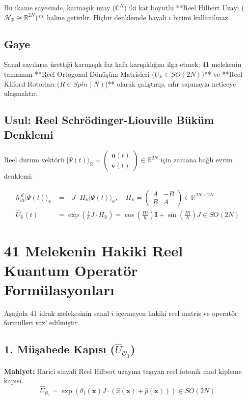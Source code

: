 \documentclass[11pt, a4paper]{article}
\begin{document}
Bu ikame sayesinde, karmaşık uzay ($\mathbb{C}^N$) iki kat boyutlu **Reel Hilbert Uzayı ($\mathcal{H}_{\mathbb{R}} \cong \mathbb{R}^{2N}$)** haline getirilir. Hiçbir denklemde hayali $i$ birimi kullanılmaz.

\subsection{Gaye}
Sanal sayıların ürettiği karmaşık faz kafa karışıklığını ilga etmek; 41 melekenin tamamını **Reel Ortogonal Dönüşüm Matrisleri ($U_{\mathbb{R}} \in SO(2N)$)** ve **Reel Kliford Rotorları ($R \in Spin(N)$)** olarak çalıştırıp, sıfır sapmayla neticeye ulaşmaktır.

\subsection{Usul: Reel Schrödinger-Liouville Büküm Denklemi}
Reel durum vektörü $|\Psi(t)\rangle_{\mathbb{R}} = \begin{pmatrix} \mathbf{u}(t) \\ \mathbf{v}(t) \end{pmatrix} \in \mathbb{R}^{2N}$ için zamana bağlı evrim denklemi:

\begin{align}
\hbar \frac{d}{dt} |\Psi(t)\rangle_{\mathbb{R}} &= -J \cdot H_{\mathbb{R}} |\Psi(t)\rangle_{\mathbb{R}}, \quad H_{\mathbb{R}} = \begin{pmatrix} A & -B \\ B & A \end{pmatrix} \in \mathbb{R}^{2N \times 2N} \\
\hat{U}_{\mathbb{R}}(t) &= \exp\left( \frac{t}{\hbar} J \cdot H_{\mathbb{R}} \right) = \cos\left( \frac{H t}{\hbar} \right) \mathbf{I} + \sin\left( \frac{H t}{\hbar} \right) J \in SO(2N)
\end{align}

\section{41 Melekenin Hakiki Reel Kuantum Operatör Formülasyonları}

Aşağıda 41 idrak melekesinin sanal $i$ içermeyen hakiki reel matris ve operatör formülleri vaz' edilmiştir.

\subsection{1. Müşahede Kapısı ($\hat{U}_{\mathcal{O}_1}$)}
\textbf{Mahiyet:} Haricî sinyali Reel Hilbert uzayına taşıyan reel fotonik mod kipleme kapısı.
\begin{equation}
\hat{U}_{\mathcal{O}_1} = \exp\left( \theta_1(\mathbf{x}) J \cdot (\hat{x}(\mathbf{x}) + \hat{p}(\mathbf{x})) \right) \in SO(2N)
\end{equation}
\end{document}

